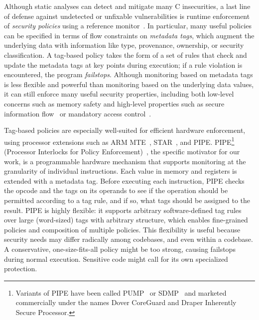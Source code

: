 \documentclass{llncs}
\begin{document}
Although static analyses can detect and mitigate many C insecurities, a last line of
defense against undetected or unfixable vulnerabilities is runtime
enforcement of {\em security policies} using a reference
monitor~\cite{Anderson72:PlanningStudy}. In particular, 
many useful policies can be specified in terms of flow constraints on 
\emph{metadata tags}, which augment the underlying data with information like type, provenance,
ownership, or security classification. A tag-based policy takes the form of a set of
rules that check and update the metadata tags at key points during execution; if a rule violation is
encountered, the program \emph{failstops}. 
Although monitoring based on metadata tags is less flexible and powerful than monitoring based on the
underlying data values, it can still enforce many useful security properties, including
both low-level concerns such as memory safety %
and high-level properties such as secure information flow~\cite{Denning76:SFIlattice} or
mandatory access control~\cite{Lampson74:Protection}.

Tag-based policies are especially well-suited for efficient hardware enforcement, using 
processor extensions such as ARM MTE~\cite{arm-mte},
STAR~\cite{Gollapudi+23}, and
PIPE.  PIPE\footnote{ Variants of PIPE have
been called PUMP~\cite{Dhawan+15} or %
SDMP~\cite{RoesslerD18}%
and marketed commercially under the names Dover CoreGuard and Draper Inherently Secure Processor.}
(Processor Interlocks for Policy Enforcement)~\cite{Azevedo+16,Azevedo+15},%
the specific motivator for our work, 
is a programmable hardware mechanism that supports monitoring 
at the granularity of individual instructions. 
Each value in memory and registers
is extended with a metadata tag. Before executing each instruction,
PIPE checks the opcode and the tags on its operands to see if the operation 
should be permitted according to a tag rule, and if so, what tags should be 
assigned to the result.
PIPE is highly flexible: it supports
arbitrary software-defined tag rules over large (word-sized) tags with arbitrary structure,
which enables fine-grained policies and composition of multiple policies. This flexibility 
is useful because security needs may differ radically among codebases,
and even within a codebase. A conservative, one-size-fits-all policy might be too strong,
causing failstops during normal execution. Sensitive code might call for its own specialized
protection.
 
\end{document}
